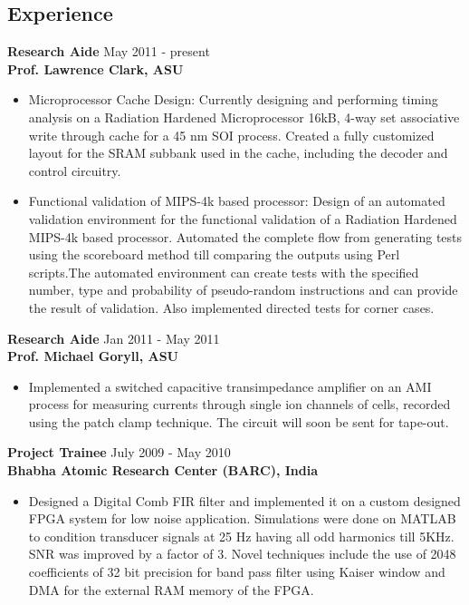 \documentclass[margin]{res}
\begin{document}
\begin{resume}
\section{Experience}
{\bf Research Aide} \hfill May 2011 - present\\
{\bf Prof. Lawrence Clark, ASU}
\begin{itemize}
    \item Microprocessor Cache Design: Currently designing and performing timing analysis on a Radiation Hardened Microprocessor 16kB, 4-way set associative write through cache for a 45 nm SOI process. Created a fully customized layout for the SRAM subbank used in the cache, including the decoder and control circuitry.
    \item Functional validation of MIPS-4k based processor: Design of an automated validation environment for the functional validation of a Radiation Hardened MIPS-4k based processor. Automated the complete flow from generating tests using the scoreboard method till comparing the outputs using Perl scripts.The automated environment can create tests with the specified number, type and probability of pseudo-random instructions and can provide the result of validation. Also implemented directed tests for corner cases.  
    
\end{itemize} 

{\bf Research Aide} \hfill Jan 2011 - May 2011\\
{\bf Prof. Michael Goryll, ASU}
\begin{itemize}
    \item Implemented a switched capacitive transimpedance amplifier on an AMI process for measuring currents through single ion channels of cells, recorded using the patch clamp technique. The circuit will soon be sent for tape-out.
\end{itemize}
 
{\bf Project Trainee} \hfill July 2009 - May 2010\\
{\bf Bhabha Atomic Research Center (BARC), India}
\begin{itemize} 
    \item Designed a Digital Comb FIR filter and implemented it on a custom designed FPGA system for low noise application. Simulations were done on MATLAB to condition transducer signals at 25 Hz having all odd harmonics till 5KHz. SNR was improved by a factor of 3. Novel techniques include the use of 2048 coefficients of 32 bit precision for band pass filter using Kaiser window and DMA for the external RAM memory of the FPGA.
\end{itemize} 



\end{resume}
\end{document}
